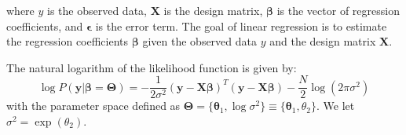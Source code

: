 \documentclass[letterpaper,12pt]{article}
\begin{document}
where $y$ is the observed data, $\bm{X}$ is the design matrix, $\bm{\beta}$ is the vector of regression coefficients, and $\bm{\epsilon}$ is the error term. 
The goal of linear regression is to estimate the regression coefficients $\bm{\beta}$ given the observed data $y$ and the design matrix $\bm{X}$.

The natural logarithm of the likelihood function is given by:
\begin{equation}
    \log P(\bm{y}|\bm{\beta} = \bm{\Theta}) = -\frac{1}{2\sigma^{2}}(\bm{y} - \bm{X}\bm{\beta})^{T}(\bm{y} - \bm{X}\bm{\beta}) - \frac{N}{2}\log(2\pi\sigma^{2})
\end{equation}
with the parameter space defined as $\bm{\Theta} = \{\bm{\theta}_{1}, \log \sigma^{2}\} \equiv \{\bm{\theta}_{1}, \theta_{2}\}$.
We let $ \sigma^{2} = \exp(\theta_{2}) $.
\end{document}
